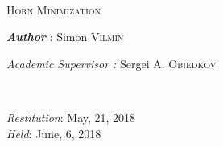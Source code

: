 \begin{titlepage}
\begin{center}
        
        \TLine \\
        \vspace{1.2em}
        \textsc{\LARGE{Horn Minimization}}
        \TLine \\
        
        \vspace{5mm}
        \noindent
        
        
        \begin{minipage}{0.4\textwidth}
            \begin{flushleft}
                \hspace{-20mm}
                \vspace{10mm}
                \textit{\textbf{Author}} : Simon \textsc{Vilmin}\\  
                
                \vspace{4mm}
                
                \hspace{-20mm}
                \emph{Academic Supervisor :} Sergei A. \textsc{Obiedkov} \\
                \vspace{1.2em}
                \hspace{-20mm}
                    
            \end{flushleft}
        \end{minipage}
        ~
        \begin{minipage}{0.4\textwidth}
            \begin{flushright}
                \vspace{19mm}
                \emph{Restitution}: May, 21, 2018 \\
                \emph{Held}: June, 6, 2018 \\
                \vspace{1.2em}
            \end{flushright}
        \end{minipage}
        
        \vspace{15mm}
        

\end{center}
\end{titlepage}
